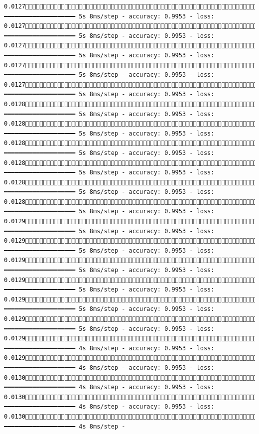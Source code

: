 \documentclass[
  letterpaper,
  DIV=11,
  numbers=noendperiod]{scrreprt}
\begin{document}
\begin{verbatim}
0.01271091/1875 ━━━━━━━━━━━━━━━━━━━━ 5s 8ms/step - accuracy: 0.9953 - loss: 0.01271099/1875 ━━━━━━━━━━━━━━━━━━━━ 5s 8ms/step - accuracy: 0.9953 - loss: 0.01271106/1875 ━━━━━━━━━━━━━━━━━━━━ 5s 8ms/step - accuracy: 0.9953 - loss: 0.01271113/1875 ━━━━━━━━━━━━━━━━━━━━ 5s 8ms/step - accuracy: 0.9953 - loss: 0.01271120/1875 ━━━━━━━━━━━━━━━━━━━━ 5s 8ms/step - accuracy: 0.9953 - loss: 0.01281127/1875 ━━━━━━━━━━━━━━━━━━━━ 5s 8ms/step - accuracy: 0.9953 - loss: 0.01281134/1875 ━━━━━━━━━━━━━━━━━━━━ 5s 8ms/step - accuracy: 0.9953 - loss: 0.01281141/1875 ━━━━━━━━━━━━━━━━━━━━ 5s 8ms/step - accuracy: 0.9953 - loss: 0.01281148/1875 ━━━━━━━━━━━━━━━━━━━━ 5s 8ms/step - accuracy: 0.9953 - loss: 0.01281154/1875 ━━━━━━━━━━━━━━━━━━━━ 5s 8ms/step - accuracy: 0.9953 - loss: 0.01281162/1875 ━━━━━━━━━━━━━━━━━━━━ 5s 8ms/step - accuracy: 0.9953 - loss: 0.01291169/1875 ━━━━━━━━━━━━━━━━━━━━ 5s 8ms/step - accuracy: 0.9953 - loss: 0.01291177/1875 ━━━━━━━━━━━━━━━━━━━━ 5s 8ms/step - accuracy: 0.9953 - loss: 0.01291185/1875 ━━━━━━━━━━━━━━━━━━━━ 5s 8ms/step - accuracy: 0.9953 - loss: 0.01291192/1875 ━━━━━━━━━━━━━━━━━━━━ 5s 8ms/step - accuracy: 0.9953 - loss: 0.01291200/1875 ━━━━━━━━━━━━━━━━━━━━ 5s 8ms/step - accuracy: 0.9953 - loss: 0.01291207/1875 ━━━━━━━━━━━━━━━━━━━━ 5s 8ms/step - accuracy: 0.9953 - loss: 0.01291214/1875 ━━━━━━━━━━━━━━━━━━━━ 4s 8ms/step - accuracy: 0.9953 - loss: 0.01291221/1875 ━━━━━━━━━━━━━━━━━━━━ 4s 8ms/step - accuracy: 0.9953 - loss: 0.01301229/1875 ━━━━━━━━━━━━━━━━━━━━ 4s 8ms/step - accuracy: 0.9953 - loss: 0.01301237/1875 ━━━━━━━━━━━━━━━━━━━━ 4s 8ms/step - accuracy: 0.9953 - loss: 0.01301244/1875 ━━━━━━━━━━━━━━━━━━━━ 4s 8ms/step - 
\end{verbatim}
\end{document}
